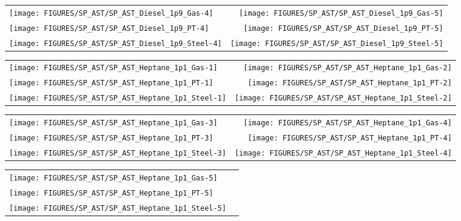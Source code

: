 \begin{figure}[p]
\begin{tabular*}{\textwidth}{l@{\extracolsep{\fill}}r}
\texttt{[image: FIGURES/SP\_AST/SP\_AST\_Diesel\_1p9\_Gas-4]}   &  \texttt{[image: FIGURES/SP\_AST/SP\_AST\_Diesel\_1p9\_Gas-5]}   \\
\texttt{[image: FIGURES/SP\_AST/SP\_AST\_Diesel\_1p9\_PT-4]}    &  \texttt{[image: FIGURES/SP\_AST/SP\_AST\_Diesel\_1p9\_PT-5]}    \\
\texttt{[image: FIGURES/SP\_AST/SP\_AST\_Diesel\_1p9\_Steel-4]} &  \texttt{[image: FIGURES/SP\_AST/SP\_AST\_Diesel\_1p9\_Steel-5]}
\end{tabular*}
\label{SP_Diesel_1p9_4m}
\end{figure}

\begin{figure}[p]
\begin{tabular*}{\textwidth}{l@{\extracolsep{\fill}}r}
\texttt{[image: FIGURES/SP\_AST/SP\_AST\_Heptane\_1p1\_Gas-1]}   &  \texttt{[image: FIGURES/SP\_AST/SP\_AST\_Heptane\_1p1\_Gas-2]}  \\
\texttt{[image: FIGURES/SP\_AST/SP\_AST\_Heptane\_1p1\_PT-1]}    &  \texttt{[image: FIGURES/SP\_AST/SP\_AST\_Heptane\_1p1\_PT-2]}   \\
\texttt{[image: FIGURES/SP\_AST/SP\_AST\_Heptane\_1p1\_Steel-1]} &  \texttt{[image: FIGURES/SP\_AST/SP\_AST\_Heptane\_1p1\_Steel-2]}
\end{tabular*}
\label{SP_Heptane_1p1_1m}
\end{figure}

\begin{figure}[p]
\begin{tabular*}{\textwidth}{l@{\extracolsep{\fill}}r}
\texttt{[image: FIGURES/SP\_AST/SP\_AST\_Heptane\_1p1\_Gas-3]}   & \texttt{[image: FIGURES/SP\_AST/SP\_AST\_Heptane\_1p1\_Gas-4]}  \\
\texttt{[image: FIGURES/SP\_AST/SP\_AST\_Heptane\_1p1\_PT-3]}    & \texttt{[image: FIGURES/SP\_AST/SP\_AST\_Heptane\_1p1\_PT-4]}   \\
\texttt{[image: FIGURES/SP\_AST/SP\_AST\_Heptane\_1p1\_Steel-3]} & \texttt{[image: FIGURES/SP\_AST/SP\_AST\_Heptane\_1p1\_Steel-4]}
\end{tabular*}
\label{SP_Heptane_1p1_3m}
\end{figure}

\begin{figure}[p]
\begin{tabular*}{\textwidth}{l@{\extracolsep{\fill}}r}
\texttt{[image: FIGURES/SP\_AST/SP\_AST\_Heptane\_1p1\_Gas-5]}   &  \\
\texttt{[image: FIGURES/SP\_AST/SP\_AST\_Heptane\_1p1\_PT-5]}    &  \\
\texttt{[image: FIGURES/SP\_AST/SP\_AST\_Heptane\_1p1\_Steel-5]} &
\end{tabular*}
\label{SP_Heptane_1p1_5m}
\end{figure}


